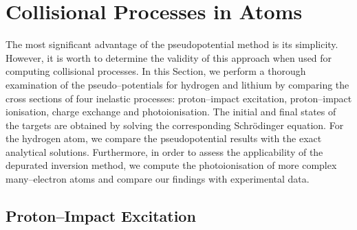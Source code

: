 \documentclass[10pt]{article}
\begin{document}
\section{Collisional Processes in Atoms}
\label{sec:colproc}

The most significant advantage of the pseudopotential method is its 
simplicity. However, it is worth to determine the validity of this 
approach when used for computing collisional processes. In this 
Section, we perform a thorough examination of the pseudo--potentials 
for hydrogen and lithium by comparing the cross sections of four 
inelastic processes: proton--impact excitation, proton--impact 
ionisation, charge exchange and photoionisation. The initial and 
final states of the targets are obtained by solving the corresponding 
Schr\"odinger equation. For the hydrogen atom, we compare the 
pseudopotential results with the exact analytical solutions. 
Furthermore, in order to assess the applicability of the depurated 
inversion method, we compute the photoionisation of more complex 
many--electron atoms and compare our findings with experimental data.


\subsection{Proton--Impact Excitation}
\end{document}
